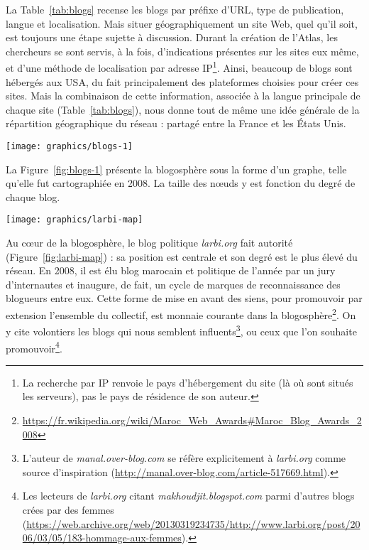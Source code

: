 \documentclass[symmetric,justified,marginals=raggedouter]{tufte-book}
\begin{document}
La Table~\ref{tab:blogs} recense les blogs par préfixe d'URL, type de publication, langue et localisation. Mais situer géographiquement un site Web, quel qu'il soit, est toujours une étape sujette à discussion. Durant la création de l'Atlas, les chercheurs se sont servis, à la fois, d'indications présentes sur les sites eux même, et d'une méthode de localisation par adresse IP\footnote{\RaggedOuter La recherche par IP renvoie le pays d'hébergement du site (là où sont situés les serveurs), pas le pays de résidence de son auteur.}. Ainsi, beaucoup de blogs sont hébergés aux USA, du fait principalement des plateformes choisies pour créer ces sites. Mais la combinaison de cette information, associée à la langue principale de chaque site (Table~\ref{tab:blogs}), nous donne tout de même une idée générale de la répartition géographique du réseau : partagé entre la France et les États Unis.

\begin{figure*}
  \texttt{[image: graphics/blogs-1]}
  \caption{La blogosphère marocaine en 2008}
  \label{fig:blogs-1}
\end{figure*}

\noindent La Figure~\ref{fig:blogs-1} présente la blogosphère sous la forme d'un graphe, telle qu'elle fut cartographiée en 2008. La taille des nœuds y est fonction du degré de chaque blog. 

\begin{marginfigure}%
  \vspace*{2cm} 
  \texttt{[image: graphics/larbi-map]}
  \vspace*{0.2cm}  
  \caption{\textit{larbi.org} (rouge) dans l'e-Diaspora marocaine}
  \label{fig:larbi-map}
\end{marginfigure} 

Au cœur de la blogosphère, le blog politique \textit{larbi.org} fait autorité (Figure~\ref{fig:larbi-map}) : sa position est centrale et son degré est le plus élevé du réseau. En 2008, il est élu blog marocain et politique de l'année par un jury d'internautes et inaugure, de fait, un cycle de marques de reconnaissance des blogueurs entre eux. Cette forme de mise en avant des siens, pour promouvoir par extension l'ensemble du collectif, est monnaie courante dans la blogosphère\footnote{\RaggedOuter \url{https://fr.wikipedia.org/wiki/Maroc\_Web\_Awards\#Maroc\_Blog\_Awards\_2008}}. On y cite volontiers les blogs qui nous semblent influents\footnote{\RaggedOuter L'auteur de \textit{manal.over-blog.com} se réfère explicitement à \textit{larbi.org} comme source d'inspiration (\url{http://manal.over-blog.com/article-517669.html}).}, ou  ceux que l'on souhaite promouvoir\footnote{\RaggedOuter Les lecteurs de \textit{larbi.org} citant \textit{makhoudjit.blogspot.com} parmi d'autres blogs crées par des femmes  (\url{https://web.archive.org/web/20130319234735/http://www.larbi.org/post/2006/03/05/183-hommage-aux-femmes}).}.
\end{document}
